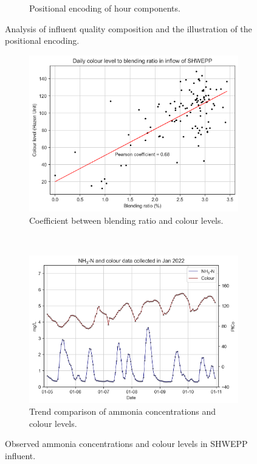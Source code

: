 \begin{figure}[!ht]
\begin{subfigure}[t]{0.5\textwidth}
      \caption{Positional encoding of hour components.} \label{fig:pos-encoding}
    \end{subfigure}%
  \caption{Analysis of influent quality composition and the illustration of the positional encoding.} \label{fig:blend-pos}
\end{figure}


\begin{figure}[!ht]
    \centering
    \begin{subfigure}[t]{0.7\textwidth}
        \includegraphics[width=\linewidth]{imgs/leachate-effluent-blend-ratio-color-plot/colour-blend-coef.png}
        \caption{Coefficient between blending ratio and colour levels.} \label{fig:blend-colour-coef}
      \end{subfigure}\\
      \hspace{2em}
    \begin{subfigure}[t]{0.7\textwidth}
        \includegraphics[width=\linewidth]{imgs/results/colour-pattern.png}
        \caption{Trend comparison of ammonia concentrations and colour levels.} \label{fig:color-to-nh3-pattern}
      \end{subfigure}%
  \caption{Observed ammonia concentrations and colour levels in SHWEPP influent.} \label{fig:observation-shweep-influent}
\end{figure}


